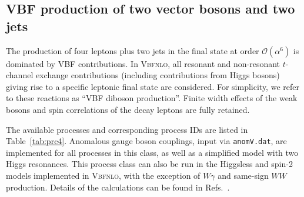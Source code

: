 \documentclass[english,12pt]{article}
\begin{document}

\subsection{VBF production of two vector bosons and two jets}

The production of four leptons plus two jets in the final state at order
$\mathcal{O}(\alpha^6)$ is dominated by VBF contributions. In \textsc{Vbfnlo},
all resonant and non-resonant $t$-channel exchange contributions (including
contributions from Higgs bosons) giving rise to a specific leptonic final state
are considered. For simplicity, we refer to these reactions as ``VBF diboson
production''. Finite width effects of the weak bosons and spin correlations of
the decay leptons are fully retained.

The available processes and corresponding process IDs are listed in
Table~\ref{tab:prc4}.  Anomalous gauge boson couplings, input via {\tt anomV.dat}, are implemented for
all processes in this class, as well as a simplified model with two Higgs resonances. 
This process class can also be run in the Higgsless
and spin-2 models implemented in \textsc{Vbfnlo}, with the exception of
$W\gamma$ and same-sign $WW$ production. Details of the calculations can be found in
Refs.~\cite{Jager:2006zc,Jager:2006cp,Bozzi:2007ur,Jager:2009xx,frank,Campanario:2013eta,kaiser}.
\end{document}
